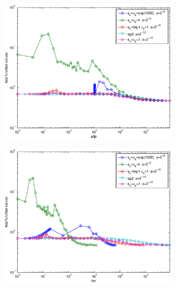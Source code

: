 \documentclass[12pt]{article}
\begin{document}
	\begin{figure}[H]
	\begin{subfigure}[b]{.5\linewidth}
		        \includegraphics[width=4in]{GenFigures/19-2-1.eps}
	\end{subfigure}%
	\begin{subfigure}[b]{.5\linewidth}
		        \includegraphics[width=4in]{GenFigures/19-2-2.eps}
	\end{subfigure}%

	\end{figure}
\end{document}
